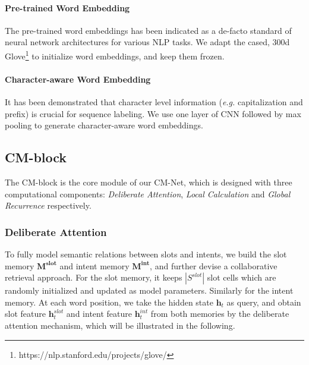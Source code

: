 \documentclass[11pt,a4paper]{article}
\begin{document}
\paragraph{Pre-trained Word Embedding}
The pre-trained word embeddings has been indicated as a de-facto standard of neural network architectures for various NLP tasks. 
We adapt the cased, 300d Glove\footnote{https://nlp.stanford.edu/projects/glove/} \cite{Glove} to initialize word embeddings, and keep them frozen.

\paragraph{Character-aware Word Embedding}
It has been demonstrated that character level information ({\em e.g.} capitalization and prefix) \cite{collobert_2011} is crucial for sequence labeling. We use one layer of CNN followed by max pooling to generate character-aware word embeddings.

\subsection{CM-block}
The CM-block is the core module of our CM-Net, which is designed with three computational components: \emph{Deliberate Attention}, \emph{Local Calculation} and \emph{Global Recurrence} respectively.

\subsubsection*{Deliberate Attention} To fully model semantic relations between slots and intents, 
we build the slot memory $\mathbf{M^{slot}} $ and  intent memory $\mathbf{M^{int}}$, and further devise a collaborative retrieval approach.
For the slot memory, it keeps $|S^{slot}|$ slot cells which are randomly initialized and updated as model parameters. Similarly for the intent memory.
At each word position, we take the hidden state $\mathbf{h}_t$ as query, and obtain slot feature $\mathbf{h}_t^{slot}$ and intent feature $\mathbf{h}_t^{int}$ from both memories by the deliberate attention mechanism, which will be illustrated in the following.
\end{document}
